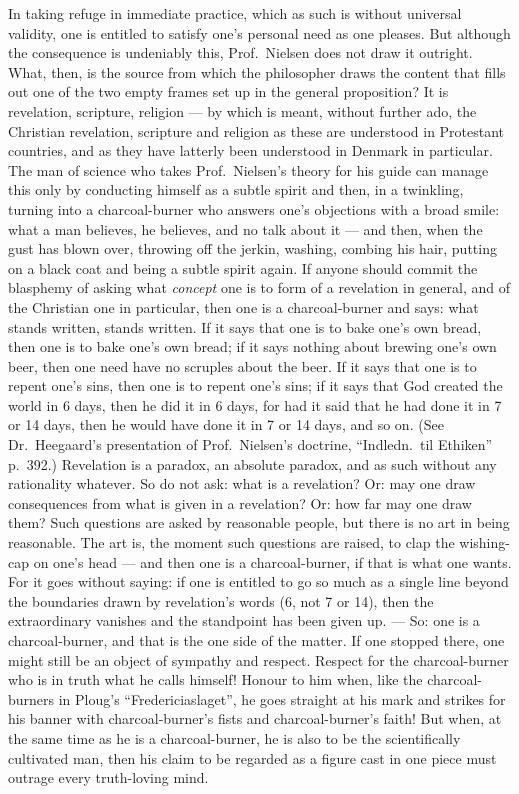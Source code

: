 \documentclass[12pt,a4paper]{book}
\newcommand{\opage}[1]{\marginnote{\footnotesize\textit{[#1]}}}
\begin{document}
In taking refuge in immediate
\opage{28}practice, which as such is without universal validity, one is
entitled to satisfy one's personal need as one pleases. But although the
consequence is undeniably this, Prof.\ Nielsen does not draw it outright. What,
then, is the source from which the philosopher draws the content that fills out
one of the two empty frames set up in the general proposition? It is
revelation, scripture, religion --- by which is meant, without further ado, the
Christian revelation, scripture and religion as these are understood in
Protestant countries, and as they have latterly been understood in Denmark in
particular. The man of science who takes Prof.\ Nielsen's theory for his guide
can manage this only by conducting himself as a subtle spirit and then, in a
twinkling, turning into a charcoal-burner who answers one's objections with a
broad smile: what a man believes, he believes, and no talk about it --- and
then, when the gust has blown over, throwing off the jerkin, washing, combing
his hair, putting on a black coat and being a subtle spirit again. If anyone
should commit the blasphemy of asking what \emph{concept} one is to form of a
revelation in general, and of the Christian one in particular, then one is a
charcoal-burner and says: what stands written, stands written. If it says that
one is to bake one's own bread, then one is to bake one's own bread; if it says
nothing about brewing one's own beer, then one need have no scruples about the
beer. If it says that one is to repent one's
\opage{29}sins, then one is to repent one's sins; if it says that God created
the world in 6 days, then he did it in 6 days, for had it said that he had done
it in 7 or 14 days, then he would have done it in 7 or 14 days, and so on. (See
Dr.\ Heegaard's presentation of Prof.\ Nielsen's doctrine, ``Indledn.\ til
Ethiken'' p.\ 392.) Revelation is a paradox, an absolute paradox, and as such
without any rationality whatever. So do not ask: what is a revelation? Or: may
one draw consequences from what is given in a revelation? Or: how far may one
draw them? Such questions are asked by reasonable people, but there is no art
in being reasonable. The art is, the moment such questions are raised, to clap
the wishing-cap on one's head --- and then one is a charcoal-burner, if that is
what one wants. For it goes without saying: if one is entitled to go so much as
a single line beyond the boundaries drawn by revelation's words (6, not 7 or
14), then the extraordinary vanishes and the standpoint has been given up. ---
So: one is a charcoal-burner, and that is the one side of the matter. If one
stopped there, one might still be an object of sympathy and respect. Respect
for the charcoal-burner who is in truth what he calls himself! Honour to him
when, like the charcoal-burners in Ploug's ``Fredericiaslaget'', he goes
straight at his mark and strikes for his banner with charcoal-burner's fists
and charcoal-burner's faith! But when, at the same time as he is a
charcoal-burner, he is also to be the scientifically cultivated man, then his
claim
\opage{30}to be regarded as a figure cast in one piece must outrage every
truth-loving mind.
\end{document}
